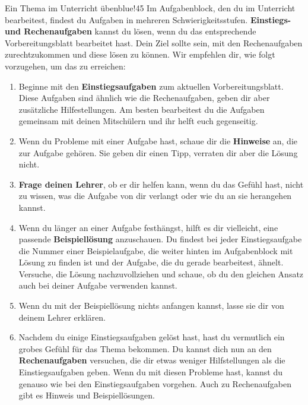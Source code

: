 \documentclass[../main.tex]{subfiles}
\begin{document}
\begin{goal}{Ein Thema im Unterricht üben}{blue!45}
    Im Aufgabenblock, den du im Unterricht bearbeitest, findest du Aufgaben in mehreren Schwierigkeitsstufen. \textbf{Einstiegs- und Rechenaufgaben} kannst du lösen, wenn du das entsprechende Vorbereitungsblatt bearbeitet hast. Dein Ziel sollte sein, mit den Rechenaufgaben zurechtzukommen und diese lösen zu können. Wir empfehlen dir, wie folgt vorzugehen, um das zu erreichen:
    \begin{enumerate}
        \item[\tikzball{blue!50!black}{1}] Beginne mit den \textbf{Einstiegsaufgaben} zum aktuellen Vorbereitungsblatt. Diese Aufgaben sind ähnlich wie die Rechenaufgaben, geben dir aber zusätzliche Hilfestellungen. Am besten bearbeitest du die Aufgaben gemeinsam mit deinen Mitschülern und ihr helft euch gegenseitig.
        \item[\tikzball{blue!50!black}{2}] Wenn du Probleme mit einer Aufgabe hast, schaue dir die \textbf{Hinweise} an, die zur Aufgabe gehören. Sie geben dir einen Tipp, verraten dir aber die Lösung nicht.
        \item[\tikzball{blue!50!black}{3}] \textbf{Frage deinen Lehrer}, ob er dir helfen kann, wenn du das Gefühl hast, nicht zu wissen, was die Aufgabe von dir verlangt oder wie du an sie herangehen kannst.
        \item[\tikzball{blue!50!black}{4}] Wenn du länger an einer Aufgabe festhängst, hilft es dir vielleicht, eine passende \textbf{Beispiellösung} anzuschauen. Du findest bei jeder Einstiegsaufgabe die Nummer einer Beispielaufgabe, die weiter hinten im Aufgabenblock mit Lösung zu finden ist und der Aufgabe, die du gerade bearbeitest, ähnelt. Versuche, die Lösung nachzuvollziehen und schaue, ob du den gleichen Ansatz auch bei deiner Aufgabe verwenden kannst.
        \item[\tikzball{blue!50!black}{5}] Wenn du mit der Beispiellösung nichts anfangen kannst, lasse sie dir von deinem Lehrer erklären.
        \item[\tikzball{blue!50!black}{6}] Nachdem du einige Einstiegsaufgaben gelöst hast, hast du vermutlich ein grobes Gefühl für das Thema bekommen. Du kannst dich nun an den \textbf{Rechenaufgaben} versuchen, die dir etwas weniger Hilfstellungen als die Einstiegsaufgaben geben. Wenn du mit diesen Probleme hast, kannst du genauso wie bei den Einstiegsaufgaben vorgehen. Auch zu Rechenaufgaben gibt es Hinweis und Beispiellösungen.
    \end{enumerate}
\end{goal}
\end{document}
